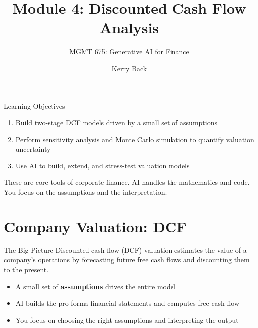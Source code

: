 \documentclass[aspectratio=169]{beamer}
\subtitle{MGMT 675: Generative AI for Finance}
\title{Module 4: Discounted Cash Flow Analysis}
\author{Kerry Back}
\date{}
\begin{document}
\maketitle

\begin{frame}{Learning Objectives}
\begin{enumerate}
  \item Build two-stage DCF models driven by a small set of assumptions
  \item Perform sensitivity analysis and Monte Carlo simulation to quantify valuation uncertainty
  \item Use AI to build, extend, and stress-test valuation models
\end{enumerate}

\vspace{0.5cm}
These are core tools of corporate finance.  AI handles the mathematics and code.  \alert{You focus on the assumptions and the interpretation.}
\end{frame}

\section{Company Valuation: DCF}

\begin{frame}{The Big Picture}
Discounted cash flow (DCF) valuation estimates the value of a company's operations by forecasting future free cash flows and discounting them to the present.

\vspace{0.3cm}
\begin{itemize}
  \item A small set of \textbf{assumptions} drives the entire model
  \item AI builds the pro forma financial statements and computes free cash flow
  \item You focus on \alert{choosing the right assumptions} and \alert{interpreting the output}
\end{itemize}
\end{frame}
\end{document}
